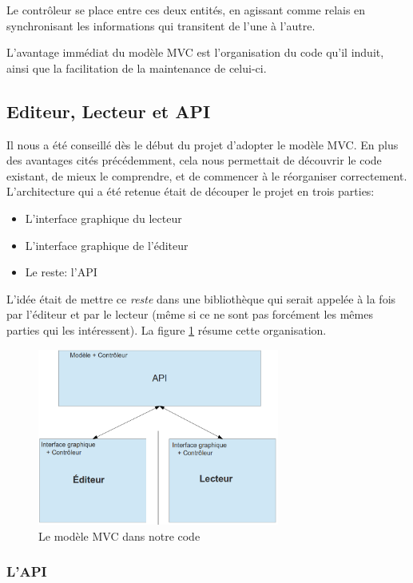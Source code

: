 \documentclass[a4paper,11pt]{article}
\begin{document}
Le contrôleur se place entre ces deux entités, en agissant comme relais en synchronisant les informations qui transitent de l'une à l'autre.

L'avantage immédiat du modèle MVC est l'organisation du code qu'il induit, ainsi que la facilitation de la maintenance de celui-ci.

\subsection{Editeur, Lecteur et API}

Il nous a été conseillé dès le début du projet d'adopter le modèle MVC. En plus des avantages cités précédemment, cela nous permettait de découvrir le code existant, de mieux le comprendre, et de commencer à le réorganiser correctement. L'architecture qui a été retenue était de découper le projet en trois parties:
\begin{itemize}
 \item L'interface graphique du lecteur
 \item L'interface graphique de l'éditeur
 \item Le reste: l'API
\end{itemize}
L'idée était de mettre ce \textit{reste} dans une bibliothèque qui serait appelée à la fois par l'éditeur et par le lecteur (même si ce ne sont pas forcément les mêmes parties qui les intéressent). La figure \ref{mvc} résume cette organisation.

\begin{figure}[H]
\begin{center}
\includegraphics[width=300px]{mvc.png}
\caption{Le modèle MVC dans notre code}
\label{mvc}
\end{center}
\end{figure}

\subsubsection{L'API}
\end{document}
